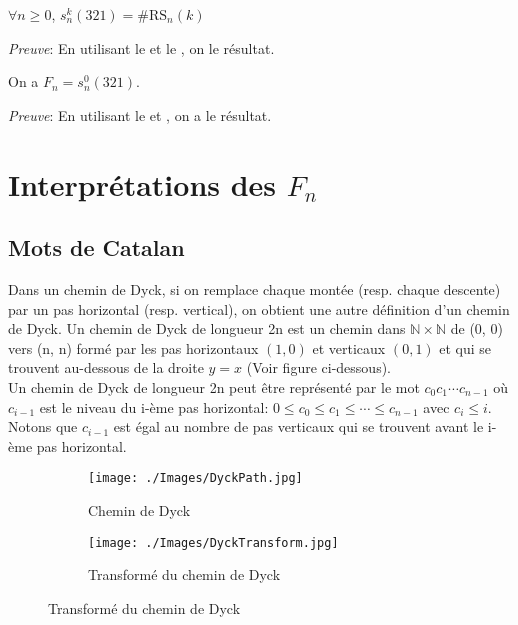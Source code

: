 \begin{corollaire} \label{avoiding_321_and_SR_n}
	$\forall n\geq 0$, $s_{n}^{k}(321)=\#\text{RS}_{n}(k)$
\end{corollaire}
\textit{Preuve}:
En utilisant le  et le , on le résultat.

\begin{corollaire} \label{fn_and_avoiding_321_without_fix}
	On a $F_{n} = s_{n}^{0}(321)$.
\end{corollaire}
\textit{Preuve}:
En utilisant le  et , on a le résultat.

\section{Interprétations des $F_{n}$}
\subsection{Mots de Catalan}
Dans un chemin de Dyck, si on remplace chaque montée (resp. chaque descente) par un pas horizontal (resp. vertical), on obtient une autre définition d’un chemin de Dyck. Un chemin de Dyck de longueur 2n est un chemin dans $\mathbb{N}\times \mathbb{N}$ de (0, 0) vers (n, n) formé par les pas horizontaux $(1, 0)$ et verticaux $(0, 1)$ et qui se trouvent au-dessous de la droite $y = x$ (Voir figure ci-dessous).\\Un chemin de Dyck de longueur 2n peut être représenté par le mot $c_{0}c_{1} \cdots c_{n-1}$ où $c_{i-1}$ est le niveau du i-ème pas horizontal: $0 \leq c_{0} \leq c_{1} \leq \cdots \leq c_{n-1}$ avec $c_{i} \leq i$. Notons que $c_{i-1}$ est égal au nombre de pas verticaux qui se trouvent avant le i-ème pas horizontal.\vspace{15pt}

\begin{figure}[h!]
	\centering
	\begin{subfigure}[b]{0.38\textwidth}
		\centering
		\texttt{[image: ./Images/DyckPath.jpg]}
		\caption{Chemin de Dyck}
	\end{subfigure}
	\hspace{2cm}
	\begin{subfigure}[b]{0.38\textwidth}
		\centering
		\texttt{[image: ./Images/DyckTransform.jpg]}
		\caption{Transformé du chemin de Dyck}
	\end{subfigure}
	\label{fig:DyckPath}
\end{figure}

